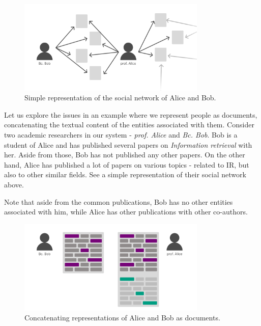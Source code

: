 \begin{figure}[ht!]
    \captionsetup{width=.9\linewidth}
    \includegraphics[width=0.8\textwidth]{../img/bob-alice-soc-netw.png}
    \centering
    \caption{Simple representation of the social network of Alice and Bob.}
\end{figure}

Let us explore the issues in an example where we represent people as documents, concatenating the textual content of the entities associated with them.
Consider two academic researchers in our system - \textit{prof. Alice} and \textit{Bc. Bob}. 
Bob is a student of Alice and has published several papers on \textit{Information retrieval} with her. Aside from those, Bob has not published any other papers.
On the other hand, Alice has published a lot of papers on various topics - related to IR, but also to other similar fields. 
See a simple representation of their social network above.

Note that aside from the common publications, Bob has no other entities associated with him, while Alice has other publications with other co-authors.

\begin{figure}[ht!]
    \captionsetup{width=.9\linewidth}
    \includegraphics[width=0.8\textwidth]{../img/bob-alice-representations.png}
    \centering
    \caption{Concatenating representations of Alice and Bob as documents.}
\end{figure}

